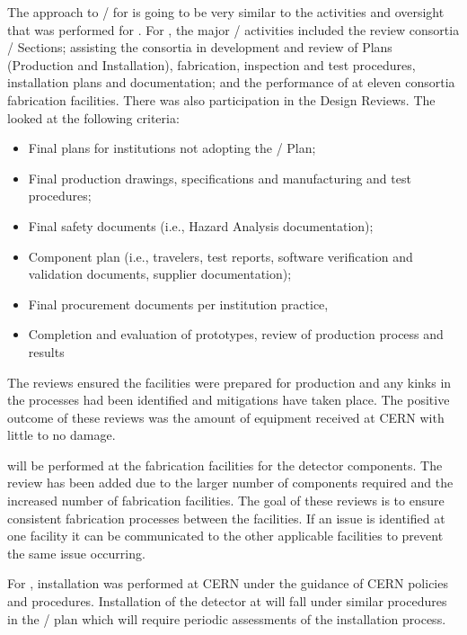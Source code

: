 The approach to / for  is going to be very
similar to the activities and oversight that was performed for
.  For , the major /
activities included the review consortia  /
Sections; assisting the consortia in development and review of 
Plans (Production and Installation), fabrication, inspection and test
procedures, installation plans and documentation; and the performance
of  at eleven consortia fabrication facilities.  There was
also  participation in the  Design Reviews.
The  looked at the following criteria:
\begin{itemize}
  \item Final  plans for institutions not adopting the
    /  Plan;
  \item Final production drawings, specifications and manufacturing
    and test procedures;
  \item Final safety documents (i.e., Hazard Analysis documentation);
  \item Component  plan (i.e., travelers, test reports, software
    verification and validation documents, supplier documentation);
  \item Final procurement documents per institution practice,
  \item Completion and evaluation of prototypes, review of production
    process and  results
\end{itemize}
The reviews ensured the facilities were prepared for production and
any kinks in the processes had been identified and mitigations have
taken place. The positive outcome of these reviews was the amount of
equipment received at CERN with little to no damage.

 will be performed at the fabrication facilities for the
 detector components. The review has been added due to the
larger number of components required and the increased number of
fabrication facilities. The goal of these reviews is to ensure
consistent fabrication processes between the facilities. If an issue
is identified at one facility it can be communicated to the other
applicable facilities to prevent the same issue occurring.

For , installation was performed at CERN under the
guidance of CERN policies and procedures. Installation of the
 detector at \surf will fall under similar procedures in the
/  plan which will require periodic
assessments of the installation process.

